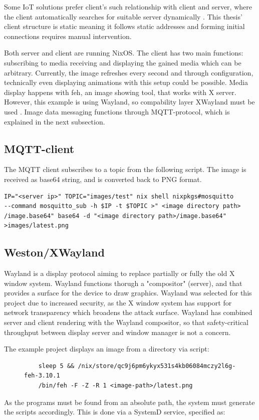 Some IoT solutions prefer client's such relationship with client and
server, where the client automatically searches for suitable server
dynamically \cite{kandoi2021operating}. This thesis' client structure
is static meaning it follows static addresses and forming initial
connections requires manual intervention.

Both server and client are running NixOS. The client has two main
functions: subscribing to media receiving and displaying the gained
media which can be arbitrary. Currently, the image refreshes every
second and through configuration, technically even displaying
animations with this setup could be possible. Media display happens
with feh, an image showing tool, that works with X server. However,
this example is using Wayland, so compability layer XWayland must be
used \cite{waylandWayland}. Image data messaging functions through
MQTT-protocol, which is explained in the next subsection.

\subsection{MQTT-client}
The MQTT client subscribes to a topic from the following script. The
image is received as base64 string, and is converted back to PNG
format.
\begin{lstlisting}
IP="<server ip>" TOPIC="images/test" nix shell nixpkgs#mosquitto
--command mosquitto_sub -h $IP -t $TOPIC >" <image directory path>
/image.base64" base64 -d "<image directory path>/image.base64"
>images/latest.png
\end{lstlisting}
\subsection{Weston/XWayland}
Wayland is a display protocol aiming to replace partially or fully the
old X window system. Wayland functions thorugh a "compositor"
(server), and that provides a surface for the device to draw
graphics. Wayland was selected for this project due to increased
security, as the X window system has support for network transparency
which broadens the attack surface. Wayland has combined server and
client rendering with the Wayland compositor, so that safety-critical
throughput between display server and window manager is not a
concern. \cite{waylandWayland} %

The example project displays an image from a directory via script:
\begin{figure}[H]
\begin{lstlisting} 
    sleep 5 && /nix/store/qc9j6pm6ykyx531s4kb06084mczy2l6g-feh-3.10.1
    /bin/feh -F -Z -R 1 <image-path>/latest.png
\end{lstlisting}
\label{fehscript}
\end{figure}
As the programs must be found from an absolute path, the system must
generate the scripts accordingly. This is done via a SystemD service,
specified as:




